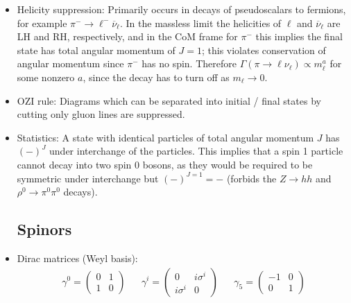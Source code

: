 \documentclass[11pt, oneside]{article}   	%
\theoremstyle{definition}
\numberwithin{equation}{subsection}		%
\begin{document}
\begin{itemize}
	\item Helicity suppression: Primarily occurs in decays of pseudoscalars to fermions, for example $\pi^-\rightarrow\ell^-
	\overline\nu_\ell$. In the massless limit the helicities of $\ell$ and $\overline\nu_\ell$ are LH and RH, respectively, and 
	in the CoM frame for $\pi^-$ this implies the final state has total angular momentum of $J = 1$; this violates conservation of 
	angular momentum since $\pi^-$ has no spin. Therefore $\Gamma(\pi\rightarrow\ell\nu_\ell)\propto m_\ell^a$ for some nonzero 
	$a$, since the decay has to turn off as $m_\ell\rightarrow 0$. 
	
	\item OZI rule: Diagrams which can be separated into initial / final states by cutting only gluon lines are suppressed. 
	
	\item Statistics: A state with identical particles of total angular momentum $J$ has $(-)^J$ under interchange of the particles. This implies that 
	a spin 1 particle cannot decay into two spin 0 bosons, as they would be required to be symmetric under interchange but $(-)^{J = 1} = -$ 
	(forbids the $Z\rightarrow hh$ and $\rho^0\rightarrow\pi^0\pi^0$ decays).
	
	\newpage
	\subsection{Spinors}
	
	\item Dirac matrices (Weyl basis):
	\begin{align}
		\gamma^0 = \begin{pmatrix} 0 & 1 \\ 1 & 0 \end{pmatrix} && \gamma^i = \begin{pmatrix} 0 & i\sigma^i \\ i\sigma^i & 0 \end{pmatrix} && \gamma_5 = \begin{pmatrix} -1 & 0 \\ 
		0 & 1 \end{pmatrix}
	\end{align}
	

\end{itemize}
\end{document}
